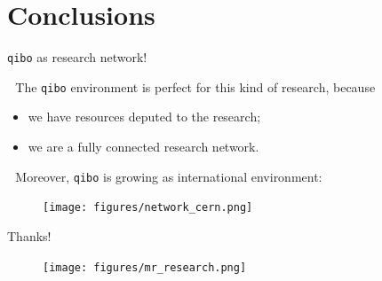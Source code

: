 \documentclass[8pt, xcolor={svgnames}, hyperref={colorlinks, linkcolor=black, citecolor=amethyst, urlcolor=amethyst}]{beamer}
\begin{document}
\section{Conclusions}


\begin{frame}{\texttt{qibo} as research network!}
\pause

\faArrowCircleRight\,\, The \texttt{qibo} environment is perfect for this kind of research, because
\begin{itemize}[noitemsep]
\pause
    \item[\faCogs] we have resources deputed to the research;
\pause
    \item[\faChild] we are a fully connected research network.
\end{itemize}
\pause

\faArrowCircleRight\,\, Moreover, \texttt{qibo} is growing as international environment:
\pause

\begin{figure}
    \texttt{[image: figures/network\_cern.png]}
\end{figure}
\end{frame}

\begin{frame}{Thanks!}
\begin{figure}
    \texttt{[image: figures/mr\_research.png]}
\end{figure}
\end{frame}
\end{document}
